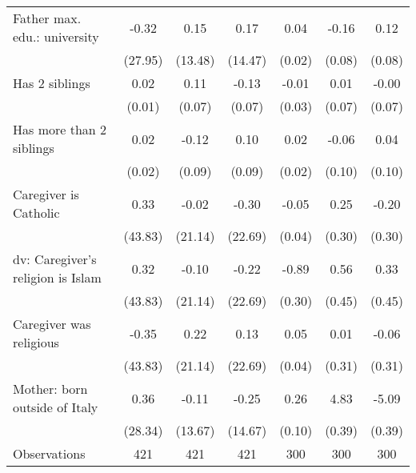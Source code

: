 {\begin{tabular}{l*{6}{c}}
\addlinespace
Father max. edu.: university&       -0.32         &        0.15         &        0.17         &        0.04         &       -0.16\sym{*}  &        0.12         \\
                    &     (27.95)         &     (13.48)         &     (14.47)         &      (0.02)         &      (0.08)         &      (0.08)         \\
\addlinespace
Has 2 siblings      &        0.02         &        0.11         &       -0.13         &       -0.01         &        0.01         &       -0.00         \\
                    &      (0.01)         &      (0.07)         &      (0.07)         &      (0.03)         &      (0.07)         &      (0.07)         \\
\addlinespace
Has more than 2 siblings&        0.02         &       -0.12         &        0.10         &        0.02         &       -0.06         &        0.04         \\
                    &      (0.02)         &      (0.09)         &      (0.09)         &      (0.02)         &      (0.10)         &      (0.10)         \\
\addlinespace
Caregiver is Catholic&        0.33         &       -0.02         &       -0.30         &       -0.05         &        0.25         &       -0.20         \\
                    &     (43.83)         &     (21.14)         &     (22.69)         &      (0.04)         &      (0.30)         &      (0.30)         \\
\addlinespace
dv: Caregiver's religion is Islam&        0.32         &       -0.10         &       -0.22         &       -0.89\sym{**} &        0.56         &        0.33         \\
                    &     (43.83)         &     (21.14)         &     (22.69)         &      (0.30)         &      (0.45)         &      (0.45)         \\
\addlinespace
Caregiver was religious&       -0.35         &        0.22         &        0.13         &        0.05         &        0.01         &       -0.06         \\
                    &     (43.83)         &     (21.14)         &     (22.69)         &      (0.04)         &      (0.31)         &      (0.31)         \\
\addlinespace
Mother: born outside of Italy&        0.36         &       -0.11         &       -0.25         &        0.26\sym{**} &        4.83\sym{***}&       -5.09\sym{***}\\
                    &     (28.34)         &     (13.67)         &     (14.67)         &      (0.10)         &      (0.39)         &      (0.39)         \\
\midrule
Observations        &         421         &         421         &         421         &         300         &         300         &         300         \\
\bottomrule
\end{tabular}
}
